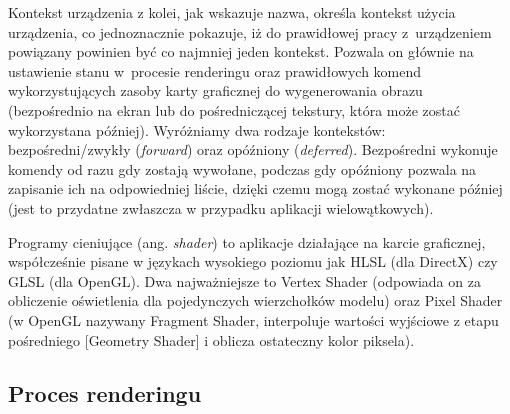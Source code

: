 Kontekst urządzenia z kolei, jak wskazuje nazwa, określa kontekst użycia urządzenia, co jednoznacznie pokazuje, iż do prawidłowej pracy z~urządzeniem powiązany powinien być co najmniej jeden kontekst. Pozwala on głównie na ustawienie stanu w~procesie renderingu oraz prawidłowych komend wykorzystujących zasoby karty graficznej do wygenerowania obrazu (bezpośrednio na ekran lub do pośredniczącej tekstury, która może zostać wykorzystana później). Wyróżniamy dwa rodzaje kontekstów: bezpośredni/zwykły (\emph{forward}) oraz opóźniony (\emph{deferred}). Bezpośredni wykonuje komendy od razu gdy zostają wywołane, podczas gdy opóźniony pozwala na zapisanie ich na odpowiedniej liście, dzięki czemu mogą zostać wykonane później (jest to przydatne zwłaszcza w przypadku aplikacji wielowątkowych).

Programy cieniujące (ang. \emph{shader}) to aplikacje działające na karcie graficznej, współcześnie pisane w językach wysokiego poziomu jak HLSL (dla DirectX) czy GLSL (dla OpenGL). Dwa najważniejsze to Vertex Shader (odpowiada on za obliczenie oświetlenia dla pojedynczych wierzchołków modelu) oraz Pixel Shader (w OpenGL nazywany Fragment Shader, interpoluje wartości wyjściowe z etapu pośredniego [Geometry Shader] i oblicza ostateczny kolor piksela).

\subsection{Proces renderingu}

